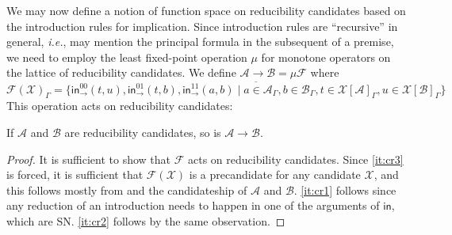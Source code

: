 \documentclass[a4paper,USenglish,cleveref, autoref, thm-restate]{lipics-v2021}
\newcommand{\ie}{\emph{i.e.}\xspace}
\newcommand{\tin}{\ensuremath{\mathsf{in}}}
\newcommand{\inn}[2]{\ensuremath{\tin_{#1}^{#2}}}
\newcommand{\red}[1][]{\longrightarrow_{#1}}
\newcommand{\cl}[1]{\overline{#1}}
\newcommand{\A}{\mathcal{A}}
\newcommand{\B}{\mathcal{B}}
\newcommand{\F}{\mathcal{F}}
\newcommand{\X}{\mathcal{X}}
\newcommand{\Up}{\mathop{\Uparrow}}
\begin{document}

We may now define a notion of function space on reducibility
candidates based on the introduction rules for implication.  Since
introduction rules are ``recursive'' in general, \ie, may mention the
principal formula in the subsequent of a premise, we need to employ
the least fixed-point operation $\mu$ for monotone operators on the
lattice of reducibility candidates.
We define $\A \to \B = \mu\F$ where
\[
  \F(\X)_\Gamma =
  \cl{\{
    \inn\to{00}(t,u),
    \inn\to{01}(t,b),
    \inn\to{11}(a,b) \mid
      a \in \A_\Gamma,
      b \in \B_\Gamma,
      t \in \X[\A]_\Gamma,
      u \in \X[\B]_\Gamma
  \}}
\]
This operation acts on reducibility candidates:
\begin{lemma}
  \label{lem:fun}
  If $\A$ and $\B$ are reducibility candidates, so is $\A \to \B$.
\end{lemma}
\begin{proof}
  It is sufficient to show that $\F$ acts on reducibility candidates.
  Since \ref{it:cr3} is forced, it is sufficient that $\F(\X)$ is a
  precandidate for any candidate $\X$, and this follows mostly from
   and the candidateship of $\A$ and $\B$.
  \ref{it:cr1} follows since any reduction of an introduction
  needs to happen in one of the arguments of $\tin$, which are SN.
  \ref{it:cr2} follows by the same observation.
\end{proof}
\end{document}
